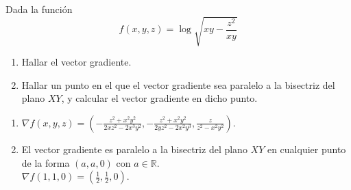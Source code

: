 {Dada la función
\[
f(x,y,z)=\log \sqrt{xy-\frac{z^2}{xy}}
\]
\begin{enumerate}
\item Hallar el vector gradiente.
\item Hallar un punto en el que el vector gradiente sea paralelo a la bisectriz del plano $XY$, y calcular el vector gradiente en dicho punto.
\end{enumerate}
}
{\begin{enumerate}
\item $\nabla f(x,y,z) = \left( -\frac{z^2+x^2y^2}{2xz^2-2x^3y^2} , -\frac{z^2+x^2y^2}{2yz^2-2x^2y^3} , \frac{z}{z^2-x^2y^2}  \right) $.
\item El vector gradiente es paralelo a la bisectriz del plano $XY$ en cualquier punto de la forma $(a,a,0)$ con $a\in \mathbb{R}$.\\
$\nabla f(1,1,0) = \left(\frac{1}{2},\frac{1}{2},0\right)$.
\end{enumerate}
}
{
}


